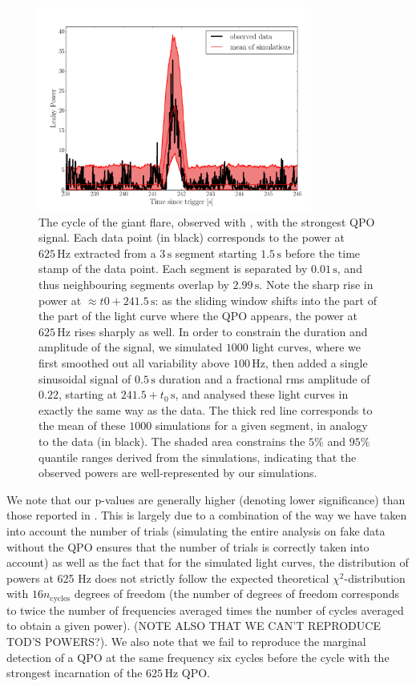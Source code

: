 \documentclass{emulateapj}
\begin{document}
\begin{figure}[htbp]
\begin{center}
\includegraphics[width=9cm]{f6.pdf}
\caption{The cycle of the giant flare, observed with \rxte, with the strongest QPO signal. Each data point (in black) corresponds to the power at $625 \,\mathrm{Hz}$ extracted from a $3\,\mathrm{s}$ segment starting $1.5\,\mathrm{s}$ before the time stamp of the data point. Each segment is separated by $0.01\,\mathrm{s}$, and thus neighbouring segments overlap by $2.99 \,\mathrm{s}$. Note the sharp rise in power at $\approx t0+ 241.5\,\mathrm{s}$: as the sliding window shifts into the part of the part of the light curve where the QPO appears, the power at $625\,\mathrm{Hz}$ rises sharply as well. In order to constrain the duration and amplitude of the signal, we simulated $1000$ light curves, where we first smoothed out all variability above $100\,\mathrm{Hz}$, then added a single sinusoidal signal of $0.5\,\mathrm{s}$ duration and a fractional rms amplitude of $0.22$, starting at $241.5 +t_0\,\mathrm{s}$, and analysed these light curves in exactly the same way as the data. The thick red line corresponds to the mean of these $1000$ simulations for a given segment, in analogy to the data (in black). The shaded area constrains the $5\%$ and $95\%$ quantile ranges derived from the simulations, indicating that the observed powers are well-represented by our simulations.}
\label{fig:rxte_sims}
\end{center}
\end{figure}

We note that our p-values are generally higher (denoting lower significance) than those reported in \citet{Strohmayer06}. This is largely due to a combination of the way we have taken into account the number of trials (simulating the entire analysis on fake data without the QPO ensures that the number of trials is correctly taken into account) as well as the fact that for the simulated light curves, the distribution of powers at 625 Hz does not strictly follow the expected theoretical $\chi^2$-distribution with $16n_{\mathrm{cycles}}$ degrees of freedom (the number of degrees of freedom corresponds to twice the number of frequencies averaged times the number of cycles averaged to obtain a given power). (NOTE ALSO THAT WE CAN'T REPRODUCE TOD'S POWERS?).
We also note that we fail to reproduce the marginal detection of a QPO at the same frequency six cycles before the cycle with the strongest incarnation of the $625\, \mathrm{Hz}$ QPO. 
\end{document}
